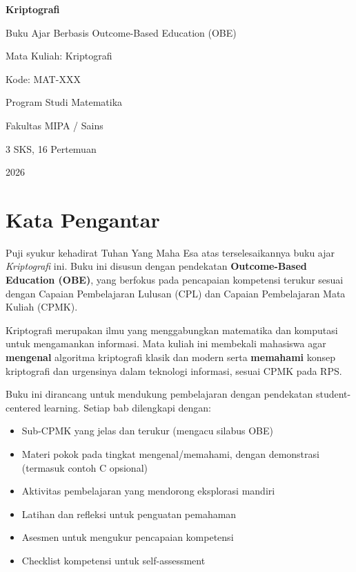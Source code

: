 \documentclass[main.tex]{subfiles}
\begin{document}
\frontmatter

\begin{titlepage}
  \centering
  \vspace*{1cm}
  {\LARGE\bfseries Kriptografi\par}
  \vspace{0.5cm}
  {\large Buku Ajar Berbasis Outcome-Based Education (OBE)\par}
  \vspace{1cm}
  {\large Mata Kuliah: Kriptografi\par}
  {\large Kode: MAT-XXX\par}
  \vspace{2cm}
  {\large Program Studi Matematika\par}
  {\large Fakultas MIPA / Sains\par}
  {\large 3 SKS, 16 Pertemuan\par}
  \vfill
  {\large 2026\par}
\end{titlepage}

\cleardoublepage

\chapter*{Kata Pengantar}

Puji syukur kehadirat Tuhan Yang Maha Esa atas terselesaikannya buku ajar \textit{Kriptografi} ini. Buku ini disusun dengan pendekatan \textbf{Outcome-Based Education (OBE)}, yang berfokus pada pencapaian kompetensi terukur sesuai dengan Capaian Pembelajaran Lulusan (CPL) dan Capaian Pembelajaran Mata Kuliah (CPMK).

Kriptografi merupakan ilmu yang menggabungkan matematika dan komputasi untuk mengamankan informasi. Mata kuliah ini membekali mahasiswa agar \textbf{mengenal} algoritma kriptografi klasik dan modern serta \textbf{memahami} konsep kriptografi dan urgensinya dalam teknologi informasi, sesuai CPMK pada RPS.

Buku ini dirancang untuk mendukung pembelajaran dengan pendekatan student-centered learning. Setiap bab dilengkapi dengan:
\begin{itemize}
  \item Sub-CPMK yang jelas dan terukur (mengacu silabus OBE)
  \item Materi pokok pada tingkat mengenal/memahami, dengan demonstrasi (termasuk contoh C opsional)
  \item Aktivitas pembelajaran yang mendorong eksplorasi mandiri
  \item Latihan dan refleksi untuk penguatan pemahaman
  \item Asesmen untuk mengukur pencapaian kompetensi
  \item Checklist kompetensi untuk self-assessment
\end{itemize}
\end{document}
